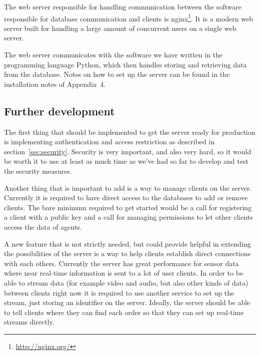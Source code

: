The web server responsible for handling communication between the software responsible for database communication and clients is nginx\footnote{\url{http://nginx.org/}}.
It is a modern web server built for handling a large amount of concurrent users on a single web server.

The web server communicates with the software we have written in the programming language Python, which then handles storing and retrieving data from the database.
Notes on how to set up the server can be found in the installation notes of Appendix~4.

\subsection{Further development}
The first thing that should be implemented to get the server ready for production is implementing authentication and access restriction as described in section~\ref{sec:security}.
Security is very important, and also very hard, so it would be worth it to use at least as much time as we've had so far to develop and test the security measures.

Another thing that is important to add is a way to manage clients on the server.
Currently it is required to have direct access to the databases to add or remove clients.
The bare minimum required to get started would be a call for registering a client with a public key and a call for managing permissions to let other clients access the data of agents.

A new feature that is not strictly needed, but could provide helpful in extending the possibilities of the server is a way to help clients establish direct connections with each others.
Currently the server has great performance for sensor data where near real-time information is sent to a lot of user clients.
In order to be able to stream data (for example video and audio, but also other kinds of data) between clients right now it is required to use another service to set up the stream, just storing an identifier on the server.
Ideally, the server should be able to tell clients where they can find each order so that they can set up real-time streams directly.
